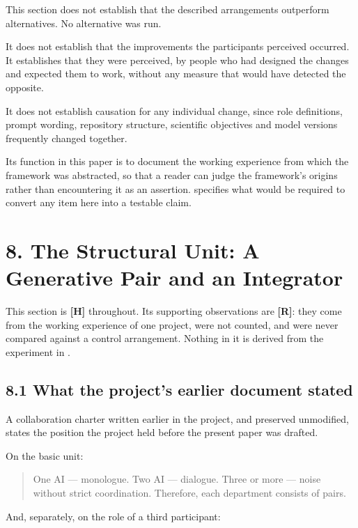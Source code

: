 This section does not establish that the described arrangements outperform alternatives. No alternative was run.

It does not establish that the improvements the participants perceived occurred. It establishes that they were perceived, by people who had designed the changes and expected them to work, without any measure that would have detected the opposite.

It does not establish causation for any individual change, since role definitions, prompt wording, repository structure, scientific objectives and model versions frequently changed together.

Its function in this paper is to document the working experience from which the framework was abstracted, so that a reader can judge the framework's origins rather than encountering it as an assertion.  specifies what would be required to convert any item here into a testable claim.


\section*{8. The Structural Unit: A Generative Pair and an Integrator}
\label{sec:en:8}

This section is \textbf{[H]} throughout. Its supporting observations are \textbf{[R]}: they come from the working experience of one project, were not counted, and were never compared against a control arrangement. Nothing in it is derived from the experiment in .


\subsection*{8.1 What the project's earlier document stated}
\label{sec:en:8.1}

A collaboration charter written earlier in the project, and preserved unmodified, states the position the project held before the present paper was drafted.

On the basic unit:

\begin{quote}
One AI — monologue. Two AI — dialogue. Three or more — noise without strict coordination. Therefore, each department consists of pairs.
\end{quote}
And, separately, on the role of a third participant:

